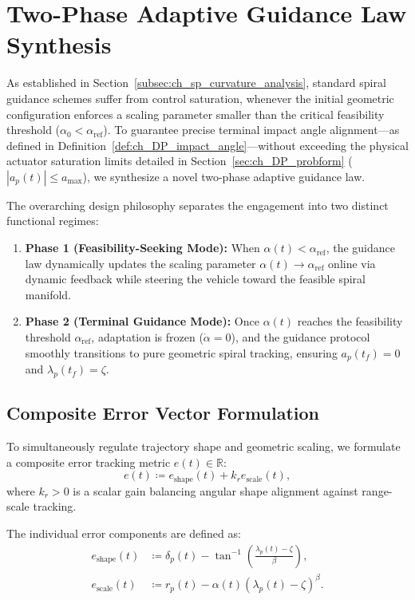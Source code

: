 \section{Two-Phase Adaptive Guidance Law Synthesis}\label{sec:ch_sp_adaptive_guidance}

As established in Section~\ref{subsec:ch_sp_curvature_analysis}, standard spiral guidance schemes suffer from control saturation, whenever the initial geometric configuration enforces a scaling parameter smaller than the critical feasibility threshold ($\alpha_0 < \alpha_{\text{ref}}$). To guarantee precise terminal impact angle alignment—as defined in Definition~\ref{def:ch_DP_impact_angle}—without exceeding the physical actuator saturation limits detailed in Section~\ref{sec:ch_DP_probform} ($|a_p(t)| \le a_{\max}$), we synthesize a novel two-phase adaptive guidance law.

The overarching design philosophy separates the engagement into two distinct functional regimes:
\begin{enumerate}
    \item \textbf{Phase 1 (Feasibility-Seeking Mode):} When $\alpha(t) < \alpha_{\text{ref}}$, the guidance law dynamically updates the scaling parameter $\alpha(t) \to \alpha_{\text{ref}}$ online via dynamic feedback while steering the vehicle toward the feasible spiral manifold.
    \item \textbf{Phase 2 (Terminal Guidance Mode):} Once $\alpha(t)$ reaches the feasibility threshold $\alpha_{\text{ref}}$, adaptation is frozen ($\dot{\alpha} = 0$), and the guidance protocol smoothly transitions to pure geometric spiral tracking, ensuring $a_p(t_f) = 0$ and $\lambda_p(t_f) = \zeta$.
\end{enumerate}
\subsection{Composite Error Vector Formulation}\label{subsec:ch_sp_error_formulation}

To simultaneously regulate trajectory shape and geometric scaling, we formulate a composite error tracking metric $e(t) \in \mathbb{R}$:
\begin{equation}\label{eq:ch_sp_composite_error}
	e(t) \coloneqq e_{\text{shape}}(t) + k_r e_{\text{scale}}(t),
\end{equation}
where $k_r > 0$ is a scalar gain balancing angular shape alignment against range-scale tracking.

The individual error components are defined as:
\begin{align}
	e_{\text{shape}}(t) &\coloneqq \delta_p(t) - \tan^{-1}\left( \frac{\lambda_p(t) - \zeta}{\beta} \right), \label{eq:ch_sp_e_shape} \\
	e_{\text{scale}}(t) &\coloneqq r_p(t) - \alpha(t) (\lambda_p(t) - \zeta)^\beta. \label{eq:ch_sp_e_scale}
\end{align}

